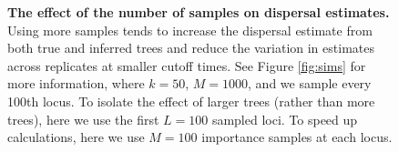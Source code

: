 \documentclass[12pt]{article}
\begin{document}
\begin{figure}[!hb]
\begin{center}

\end{center}

\caption{
\textbf{The effect of the number of samples on dispersal estimates.}
Using more samples tends to increase the dispersal estimate from both true and inferred trees and reduce the variation in estimates across replicates at smaller cutoff times.
See Figure \ref{fig:sims} for more information, where $k=50$, $M=1000$, and we sample every 100th locus. 
To isolate the effect of larger trees (rather than more trees), here we use the first $L=100$ sampled loci.
To speed up calculations, here we use $M=100$ importance samples at each locus. 
}

\label{fig:sup_sigma_samples}
\end{figure}


\end{document}
